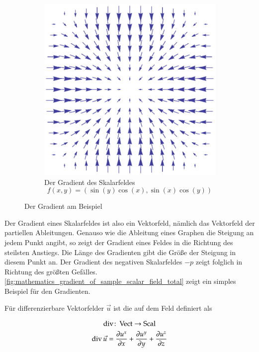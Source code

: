 \begin{figure}[ht]
\begin{subfigure}[t]{0.5\textwidth}
		\centering
		\includegraphics[width=\textwidth]{images/gradient_of_scalar_field}
		\caption{Der Gradient des Skalarfeldes \[ f(x,y)=(\sin(y)\cos(x),\sin(x)\cos(y)) \]}
		\label{fig:mathematics_gradient_of_sample_scalar_field}
	\end{subfigure}
	\caption{Der Gradient am Beispiel}
	\label{fig:mathematics_gradient_of_sample_scalar_field_total}
\end{figure}

Der Gradient eines Skalarfeldes ist also ein Vektorfeld, nämlich das
Vektorfeld der partiellen Ableitungen. Genauso wie die Ableitung eines
Graphen die Steigung an jedem Punkt angibt, so zeigt der Gradient
eines Feldes in die Richtung des steilsten Anstiegs. Die Länge des
Gradienten gibt die Größe der Steigung in diesem Punkt an. Der
Gradient des negativen Skalarfeldes $-p$ zeigt folglich in Richtung
des größten Gefälles.
\autoref{fig:mathematics_gradient_of_sample_scalar_field_total} zeigt
ein simples Beispiel für den Gradienten.

Für differenzierbare Vektorfelder $\vec{u}$ ist die
 auf dem Feld definiert als

\begin{gather}
\operatorname*{div} \colon \operatorname*{Vect} \to \operatorname*{Scal} \\
\operatorname*{div} \vec{u}
=
\frac{\partial u^x}{\partial x} +
\frac{\partial u^y}{\partial y} +
\frac{\partial u^z}{\partial z}
\end{gather}

